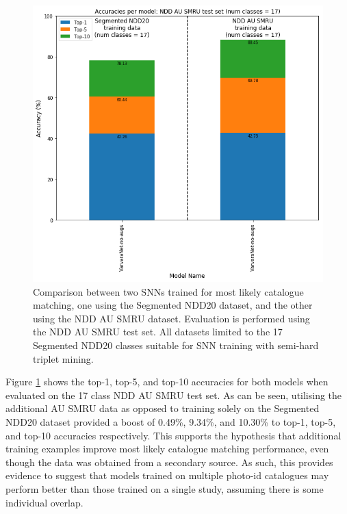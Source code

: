 \begin{figure}
	\begin{center}
		\includegraphics[scale=0.5]{Chapter6/figs/effect-of-au-smru.png}
	\end{center}
	\caption[Comparison between two SNNs trained for most likely catalogue matching, one using the Segmented NDD20 dataset, and the other using the NDD AU SMRU dataset.]{Comparison between two SNNs trained for most likely catalogue matching, one using the Segmented NDD20 dataset, and the other using the NDD AU SMRU dataset. Evaluation is performed using the NDD AU SMRU test set. All datasets limited to the 17 Segmented NDD20 classes suitable for SNN training with semi-hard triplet mining.}
	\label{fig:effect-of-au-smru}
\end{figure}

Figure \ref{fig:effect-of-au-smru} shows the top-1, top-5, and top-10 accuracies for both models when evaluated on the 17 class NDD AU SMRU test set. As can be seen, utilising the additional AU SMRU data as opposed to training solely on the Segmented NDD20 dataset provided a boost of 0.49\%, 9.34\%, and 10.30\% to top-1, top-5, and top-10 accuracies respectively. This supports the hypothesis that additional training examples improve most likely catalogue matching performance, even though the data was obtained from a secondary source. As such, this provides evidence to suggest that models trained on multiple photo-id catalogues may perform better than those trained on a single study, assuming there is some individual overlap.

